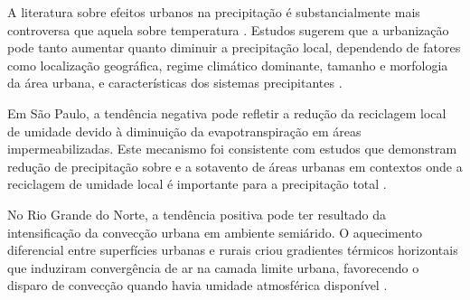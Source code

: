 A literatura sobre efeitos urbanos na precipitação é substancialmente mais controversa que aquela sobre temperatura \citep{shepherd2005review, han2014effects, niyogi2017urbanization}. Estudos sugerem que a urbanização pode tanto aumentar quanto diminuir a precipitação local, dependendo de fatores como localização geográfica, regime climático dominante, tamanho e morfologia da área urbana, e características dos sistemas precipitantes \citep{liu2017precipitation}.

Em São Paulo, a tendência negativa pode refletir a redução da reciclagem local de umidade devido à diminuição da evapotranspiração em áreas impermeabilizadas. Este mecanismo foi consistente com estudos que demonstram redução de precipitação sobre e a sotavento de áreas urbanas em contextos onde a reciclagem de umidade local é importante para a precipitação total \citep{spracklen2012observations}.

No Rio Grande do Norte, a tendência positiva pode ter resultado da intensificação da convecção urbana em ambiente semiárido. O aquecimento diferencial entre superfícies urbanas e rurais criou gradientes térmicos horizontais que induziram convergência de ar na camada limite urbana, favorecendo o disparo de convecção quando havia umidade atmosférica disponível \citep{shepherd2002atlanta, niyogi2017urbanization}.